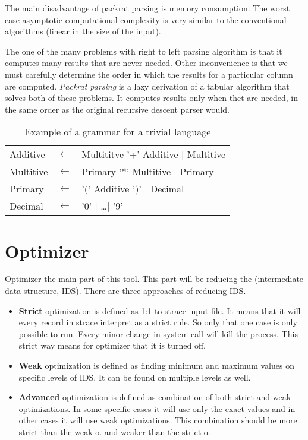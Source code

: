The main disadvantage of packrat parsing is memory consumption.
The worst case asymptotic computational complexity is very similar to the conventional algorithms (linear in the size of the input).

The one of the many problems with right to left parsing algorithm is that it computes many results that are never needed.
Other inconvenience is that we must carefully determine the order in which the results for a particular column are computed.
\textit{Packrat parsing} is a lazy derivation of a tabular algorithm that solves both of these problems. It computes results only when thet are needed, in the same order as the original recursive descent parser would.
\cite{Ford:PEG}

\begin{table}
	\begin{center}
  \begin{tabular}{lcl}
      Additive  & $\leftarrow$ & Multititve '+' Additive | Multitive \\
      Multitive & $\leftarrow$ & Primary '*' Multitive | Primary     \\
      Primary   & $\leftarrow$ & '(' Additive ')' | Decimal          \\
      Decimal   & $\leftarrow$ & '0' | \ldots | '9'
  \end{tabular}
  \end{center}
  \caption{Example of a grammar for a trivial language}
  \label{fig:pegtl:example}
\end{table}

\section{Optimizer}
Optimizer the main part of this tool.
This part will be reducing the (intermediate data structure, IDS).
There are three approaches of reducing IDS.
\begin{itemize}
  \item \textbf{Strict} optimization is defined as 1:1 to strace input file. It means that it will every record in strace interpret as a strict rule. So only that one case is only possible to run. Every minor change in system call will kill the process. This strict way means for optimizer that it is turned off.

  \item \textbf{Weak} optimization is defined as finding minimum and maximum values on specific levels of IDS. It can be found on multiple levels as well.

  \item \textbf{Advanced} optimization is defined as combination of both strict and weak optimizations. In some specific cases it will use only the exact values and in other cases it will use weak optimizations. This combination should be more strict than the weak o. and weaker than the strict o.
\end{itemize}

